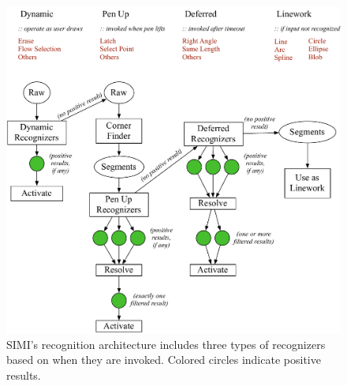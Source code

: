 \begin{figure}[p]
  \centering
  \includegraphics[width=\linewidth]{img/recognition-arch-full.pdf}
  \caption[SIMI Recognition Architecture]{SIMI's recognition
    architecture includes three types of recognizers based on when
    they are invoked. Colored circles indicate positive results.}
  \label{fig:recog-arch}
\end{figure}
